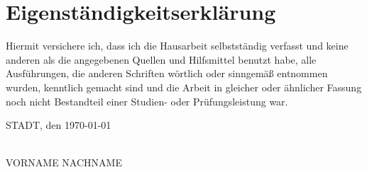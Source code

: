 \newpage



\printbibliography
\newpage
%


\newpage
\section*{Eigenständigkeitserklärung}


Hiermit versichere ich, dass ich die Hausarbeit selbstständig verfasst und keine anderen als die angegebenen Quellen und Hilfsmittel benutzt habe, alle Ausführungen, die anderen Schriften wörtlich oder sinngemäß entnommen wurden, kenntlich gemacht sind und die Arbeit in gleicher oder ähnlicher Fassung noch nicht Bestandteil einer Studien- oder Prüfungsleistung war.

\vspace{100mm}
\noindent{}STADT, den \today
\begin{minipage}[t]{8cm}
\centering \hspace{20mm} \hrulefill \\
\hspace{20mm}VORNAME NACHNAME
\end{minipage}